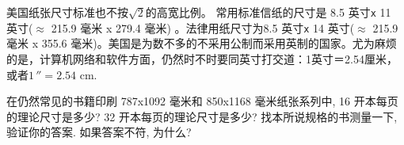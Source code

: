 美国纸张尺寸标准也不按$\sqrt{2}$的高宽比例。 常用标准信纸的尺寸是 8.5 英寸\texttt{x}{ }11 英寸($\approx$ 215.9 毫米 x 279.4 毫米) 。法律用纸尺寸为8.5 英寸\texttt{x}{ }14 英寸($\approx$ 215.9 毫米 x 355.6 毫米)。美国是为数不多的不采用公制而采用英制的国家。尤为麻烦的是，计算机网络和软件方面，仍然时不时要同英寸打交道：1英寸＝2.54厘米，或者$1\,'' = 2.54$ cm.

\begin{Exercises}
	\item 在仍然常见的书籍印刷 787x1092 毫米和 850x1168 毫米纸张系列中, 16 开本每页的理论尺寸是多少? 32 开本每页的理论尺寸是多少? 找本所说规格的书测量一下,验证你的答案. 如果答案不符, 为什么?
\end{Exercises}

